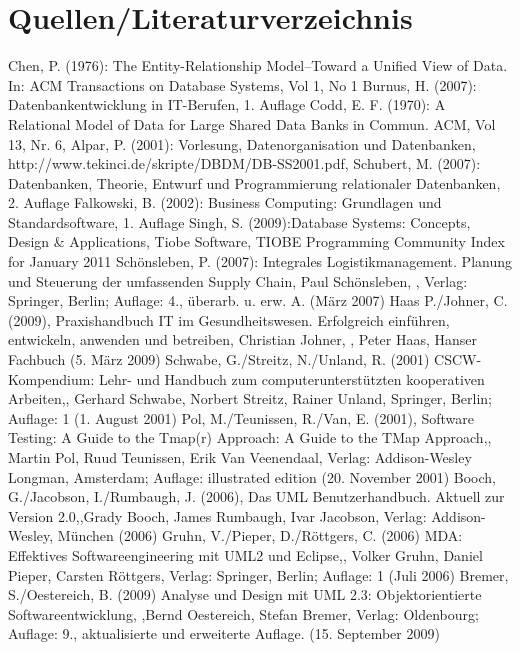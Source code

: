 \chapter*{Quellen/Literaturverzeichnis}



Chen, P. (1976): The Entity-Relationship Model--Toward a Unified View of Data. In: ACM Transactions on Database Systems, Vol 1, No 1
Burnus, H. (2007): Datenbankentwicklung in IT-Berufen, 1. Auflage
Codd, E. F. (1970): A Relational Model of Data for Large Shared Data Banks in Commun. ACM, Vol 13, Nr. 6,
Alpar, P. (2001): Vorlesung, Datenorganisation und Datenbanken,  http://www.tekinci.de/skripte/DBDM/DB-SS2001.pdf,
Schubert, M. (2007): Datenbanken, Theorie, Entwurf und Programmierung relationaler Datenbanken, 2. Auflage
Falkowski, B. (2002): Business Computing: Grundlagen und Standardsoftware, 1. Auflage
Singh, S. (2009):Database Systems: Concepts, Design \& Applications, 
Tiobe Software, TIOBE Programming Community Index for January 2011
Schönsleben, P. (2007): Integrales Logistikmanagement. Planung und Steuerung der umfassenden Supply Chain, Paul Schönsleben, , Verlag: Springer, Berlin; Auflage: 4., überarb. u. erw. A. (März 2007)
Haas P./Johner, C. (2009), Praxishandbuch IT im Gesundheitswesen. Erfolgreich einführen, entwickeln, anwenden und betreiben, Christian Johner, , Peter Haas, Hanser Fachbuch (5. März 2009)
Schwabe, G./Streitz, N./Unland, R. (2001) CSCW-Kompendium: Lehr- und Handbuch zum computerunterstützten kooperativen Arbeiten,,  Gerhard Schwabe, Norbert Streitz, Rainer Unland, Springer, Berlin; Auflage: 1 (1. August 2001)
Pol, M./Teunissen, R./Van, E. (2001), Software Testing: A Guide to the Tmap(r) Approach: A Guide to the TMap Approach,, Martin Pol, Ruud Teunissen, Erik Van Veenendaal, Verlag: Addison-Wesley Longman, Amsterdam; Auflage: illustrated edition (20. November 2001)
Booch, G./Jacobson, I./Rumbaugh, J. (2006), Das UML Benutzerhandbuch. Aktuell zur Version 2.0,,Grady Booch, James Rumbaugh, Ivar Jacobson, Verlag: Addison-Wesley, München (2006)
Gruhn, V./Pieper, D./Röttgers, C. (2006) MDA: Effektives Softwareengineering mit UML2 und Eclipse,, Volker Gruhn, Daniel Pieper, Carsten Röttgers, Verlag: Springer, Berlin; Auflage: 1 (Juli 2006)
Bremer, S./Oestereich, B. (2009) Analyse und Design mit UML 2.3: Objektorientierte Softwareentwicklung, ,Bernd Oestereich, Stefan Bremer, Verlag: Oldenbourg; Auflage: 9., aktualisierte und erweiterte Auflage. (15. September 2009)
